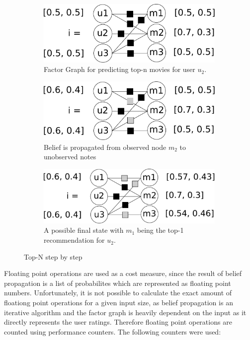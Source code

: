 \begin{figure}
\centering
\begin{subfigure}{.6\columnwidth}
\includegraphics[scale=0.3]{graphics/top-n-graph.pdf}%
\caption{Factor Graph for predicting top-n movies for user $u_2$.
\label{top_n_graph}
}
\end{subfigure}\hfill%
\begin{subfigure}{.6\columnwidth}
\includegraphics[scale=0.3]{graphics/top-n-important-messages.pdf}%
\caption{Belief is propagated from observed node $m_2$ to unobserved notes 
\label{top_n_graph_important_msg}
}
\end{subfigure}\hfill%
\begin{subfigure}{.6\columnwidth}
\includegraphics[scale=0.3]{graphics/top-n-final.pdf}%
\caption{A possible final state with $m_1$ being the top-1 recommendation for $u_2$. 
\label{top_n_graph_final_state}
}
\end{subfigure}
\caption{Top-N step by step}
\end{figure}


Floating point operations are used as a cost measure, since the result of belief propagation is a list of probabilites which are represented as floating point numbers. Unfortunately, it is not possible to calculate the exact amount of floationg point operations for a given input size, as belief propagation is an iterative algorithm and the factor graph is heavily dependent on the input as it directly represents the user ratings. Therefore floating point operations are counted using performance counters. The following counters were used:


